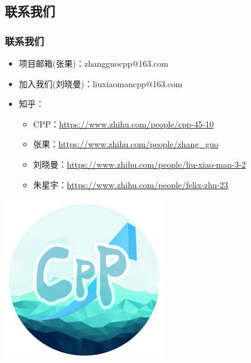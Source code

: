 \documentclass{beamer}
\begin{document}
\subsection{联系我们}
\begin{frame}
\frametitle{联系我们}
\begin{itemize}
  \item 项目邮箱(张果)：zhangguocpp@163.com
  \item 加入我们(刘晓曼)：liuxiaomancpp@163.com
  \item 知乎：
  \begin{itemize}
    \item CPP：\url{https://www.zhihu.com/people/cpp-45-10}
    \item 张果：\url{https://www.zhihu.com/people/zhang_guo}
    \item 刘晓曼：\url{https://www.zhihu.com/people/liu-xiao-man-3-2}
    \item 朱星宇：\url{https://www.zhihu.com/people/felix-zhu-23}
  \end{itemize}
\end{itemize}
\end{frame}

\begin{frame}
\begin{center}
  \includegraphics[width=7cm,height=7cm]{CPP.jpg}
\end{center}
\end{frame}
\end{document}

